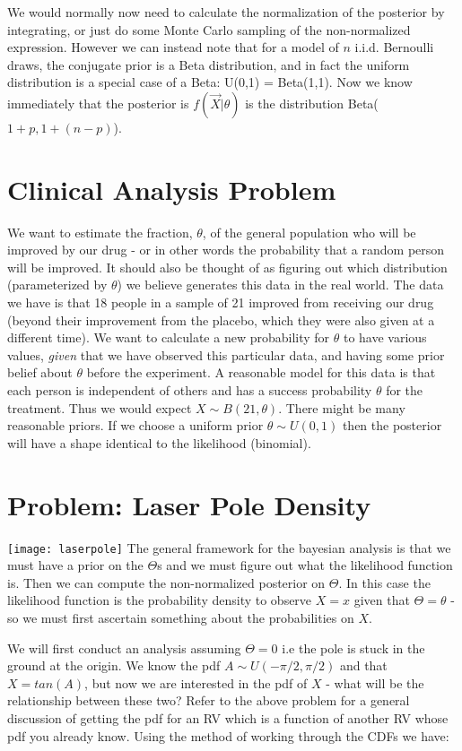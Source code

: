 We would normally now need to calculate the normalization of the posterior by integrating, or just do some Monte Carlo sampling of the non-normalized expression. However we can instead note that for a model of $n$ i.i.d. Bernoulli draws, the conjugate prior is a Beta distribution, and in fact the uniform distribution is a special case of a Beta: U(0,1) = Beta(1,1). Now we know immediately that the posterior is $f(\vec{X}|\theta)$ is the distribution Beta($1+p, 1+(n-p)$).


\section{Clinical Analysis Problem}
We want to estimate the fraction, $\theta$, of the general population who will be improved by our drug - or in other words the probability that a random person will be improved. It should also be thought of as figuring out which distribution (parameterized by $\theta$) we believe generates this data in the real world. The data we have is that 18 people in a sample of 21 improved from receiving our drug (beyond their improvement from the placebo, which they were also given at a different time). We want to calculate a new probability for $\theta$ to have various values, \textit{given} that we have observed this particular data, and having some prior belief about $\theta$ before the experiment. 
\nn
A reasonable model for this data is that each person is independent of others and has a success probability $\theta$ for the treatment. Thus we would expect $X\sim B(21,\theta)$. 
\nn
There might be many reasonable priors. If we choose a uniform prior $\theta \sim U(0,1)$ then the posterior will have a shape identical to the likelihood (binomial). 


\section{Problem: Laser Pole Density}

\texttt{[image: laserpole]} 
The general framework for the bayesian analysis is that we must have a prior on the $\Theta$s and we must figure out what the likelihood function is. Then we can compute the non-normalized posterior on $\Theta$. In this case the likelihood function is the probability density to observe $X=x$ given that $\Theta=\theta$ - so we must first ascertain something about the probabilities on $X$.
\n

We will first conduct an analysis assuming $\Theta =0$ i.e the pole is stuck in the ground at the origin. We know the pdf $A \sim U(-\pi/2,\pi/2)$ and that $X=tan(A)$, but now we are interested in the pdf of $X$ - what will be the relationship between these two? Refer to the above problem for a general discussion of getting the pdf for an RV which is a function of another RV whose pdf you already know. Using the method of working through the CDFs we have:

